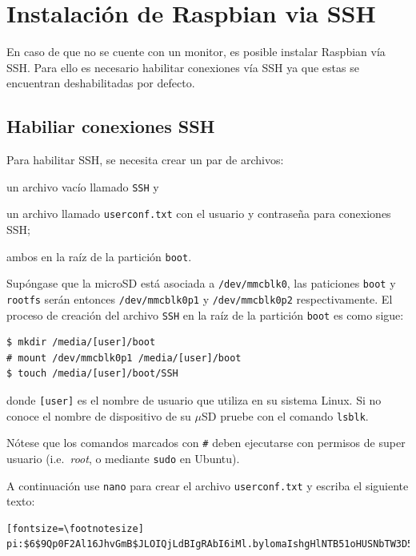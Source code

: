 \documentclass[letterpaper,10.5pt]{article}
\begin{document}
\section{Instalación de Raspbian via SSH}%
\label{sec:annex1}
En caso de que no se cuente con un monitor, es posible instalar Raspbian vía SSH. %
Para ello es necesario habilitar conexiones vía SSH ya que estas se encuentran deshabilitadas por defecto.



\subsection{Habiliar conexiones SSH}%
\label{sec:annex1-ssh-enable}
Para habilitar SSH, se necesita crear un par de archivos:
\begin{enumerate*}[label=\roman*\rpar]
	\item un archivo vacío llamado \texttt{SSH}
	y
	\item un archivo llamado \texttt{userconf.txt} con el usuario y contraseña para conexiones SSH; %
\end{enumerate*}
ambos en la raíz de la partición \texttt{boot}.

Supóngase que la microSD está asociada a \texttt{/dev/mmcblk0}, las paticiones \texttt{boot} y \texttt{rootfs} serán entonces \texttt{/dev/mmcblk0p1} y \texttt{/dev/mmcblk0p2} respectivamente.
El proceso de creación del archivo \texttt{SSH} en la raíz de la partición \texttt{boot} es como sigue:

\begin{Verbatim}[fontsize=\footnotesize]
$ mkdir /media/[user]/boot
# mount /dev/mmcblk0p1 /media/[user]/boot
$ touch /media/[user]/boot/SSH
\end{Verbatim}

\noindent donde \texttt{[user]} es el nombre de usuario que utiliza en su sistema Linux.
Si no conoce el nombre de dispositivo de su $\mu$SD pruebe con el comando \texttt{lsblk}.

Nótese que los comandos marcados con \texttt{\#} deben ejecutarse con permisos de super usuario (i.e.~\emph{root}, o mediante \texttt{sudo} en Ubuntu).

A continuación use \texttt{nano} para crear el archivo \texttt{userconf.txt} y escriba el siguiente texto:
\begin{verbatim}[fontsize=\footnotesize]
pi:$6$9Qp0F2Al16JhvGmB$JLOIQjLdBIgRAbI6iMl.bylomaIshgHlNTB51oHUSNbTW3D5l6hEnPr6HEBtMo/0IKwlGkc7.FlFOhaMwPKB1/
\end{verbatim}
\end{document}
